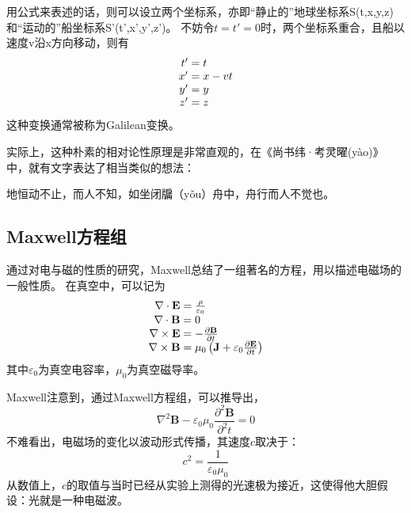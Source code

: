 用公式来表述的话，则可以设立两个坐标系，亦即“静止的”地球坐标系S(t,x,y,z)和“运动的”船坐标系S'(t',x',y',z')。
不妨令$t=t'=0$时，两个坐标系重合，且船以速度v沿x方向移动，则有
\begin{equation}
\begin{array}{r@{}l}
t' &{}= t \\
x' &{}= x-vt\\
y' &{}= y \\
z' &{}= z 
\end{array}\label{eq:galileo}
\end{equation}
这种变换通常被称为Galilean变换。

实际上，这种朴素的相对论性原理是非常直观的，在《尚书纬·考灵曜(y{\` a}o)》中，就有文字表达了相当类似的想法：
\begin{myprop}{}{}
地恒动不止，而人不知，如坐闭牖（y{\v o}u）舟中，舟行而人不觉也。
\end{myprop}

\subsection{Maxwell方程组}
通过对电与磁的性质的研究，Maxwell总结了一组著名的方程，用以描述电磁场的一般性质。
在真空中，可以记为
\begin{equation}
\begin{array}{r@{}l}
\nabla \cdot \mathbf {E} &{}= {\frac {\rho }{\varepsilon _{0}}}\\
\nabla \cdot \mathbf {B} &{}= 0\\
\nabla \times \mathbf {E}&{}=-{\frac {\partial \mathbf {B} }{\partial t}}\\
\nabla \times \mathbf {B}&{}=\mu _{0}\left(\mathbf {J} +\varepsilon _{0}{\frac {\partial \mathbf {E} }{\partial t}}\right)
\end{array}\label{eq:maxwell}
\end{equation}
其中$\varepsilon_0$为真空电容率，$\mu_0$为真空磁导率。

Maxwell注意到，通过Maxwell方程组，可以推导出，
\begin{equation}\label{eq:EMwave}
\nabla ^2 \mathbf {B} - \varepsilon_{0} \mu_0 \frac {\partial^2 \mathbf {B} }{\partial^2 t}= 0
\end{equation}
不难看出，电磁场的变化以波动形式传播，其速度$c$取决于：
\begin{equation}\label{eq:SpeedOfLight}
c^2 = \frac{1}{\varepsilon_0 \mu_0}
\end{equation} 
从数值上，$c$的取值与当时已经从实验上测得的光速极为接近，这使得他大胆假设：光就是一种电磁波。

